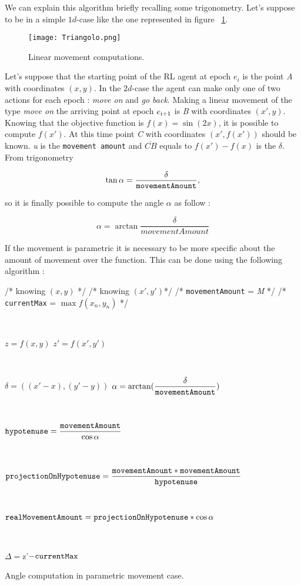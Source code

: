 We can explain this algorithm briefly recalling some trigonometry. Let's suppose to be in a simple $1d$-case like the one represented in figure ~\ref{fig:LMComputations}.

\begin{figure} [h!]
	\centering
	\texttt{[image: Triangolo.png]}
	\caption{Linear movement computations.}
	\label{fig:LMComputations}
\end{figure}

Let's suppose that the starting point of the RL agent at epoch $e_i$ is the point \textit{A} with coordinates $(x, y)$. In the $2d$-case the agent can make only one of two actions for each epoch : \textit{move on} and \textit{go back}. Making a linear movement of the type \textit{move on} the arriving point at epoch $e\textsubscript{i+1}$ is \textit{B} with coordinates $(x', y)$. Knowing that the objective function is $f(x) = \sin(2x)$, it is possible to compute $f(x')$. At this time point \textit{C} with coordinates $(x', f(x'))$ should be known. \textit{u} is the {\tt movement amount} and $\overline{CB}$ equals to $f(x') - f(x)$ is the $\delta$. From trigonometry 

\begin{equation}
	\tan \alpha = \dfrac{\delta}{\tt movementAmount},
\end{equation}

so it is finally possible to compute the angle $\alpha$ as follow :

\begin{equation}
	\alpha = \arctan \dfrac{\delta}{movementAmount}
\end{equation}

If the movement is parametric it is necessary to be more specific about the amount of movement over the function. This can be done using the following algorithm :

\begin{algorithm}
	/* knowing $(x, y)$ */ \;
	/* knowing $(x', y')$*/ \;
	/* {\tt movementAmount} = \textit{M} */ \;
	/* {\tt currentMax} = $\max f(x_n, y_n)$ */ \;
	
	
	\
	
	$z = f(x, y)$ \;
	$z' = f(x', y')$\;
	
	\
	
	$\delta = ((x'-x),  (y'-y))$ \;
	$\alpha = \arctan(\dfrac{\delta}{\tt movementAmount})$ \;
	
	\
	
	${\tt hypotenuse} = \dfrac{{\tt movementAmount}}{\cos \alpha}$ \;
	
	\
	
	${\tt projectionOnHypotenuse} = \dfrac{{\tt movementAmount} * {\tt movementAmount}}{{\tt hypotenuse}}$ \;
	
	\
	
	${\tt realMovementAmount} = {\tt projectionOnHypotenuse} * \cos \alpha$ \;
	 
	 \
	
	$\Delta = $z'$ - {\tt currentMax} $\;
	
	\caption{Angle computation in parametric movement case.} 
	\label{PMAlgo}
	
\end{algorithm}

